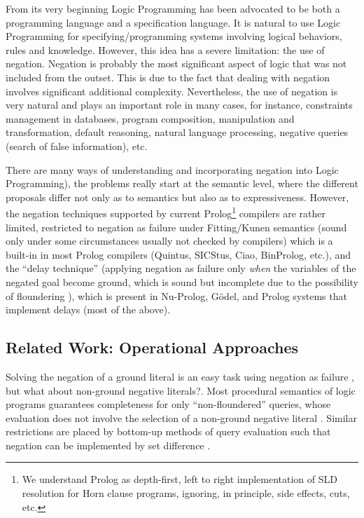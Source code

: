 \documentclass{tlp}
\newcommand{\naf}{{\em naf}}\newcommand{\viejo}[1]{}
\begin{document}
From its very beginning Logic Programming has been advocated to be
both a programming language and a specification language. It is
natural to use Logic Programming for specifying/programming systems
involving logical behaviors, rules and knowledge. However, this idea
has a severe limitation: the use of negation. Negation is probably the
most significant aspect of logic that was not included from the
outset. This is due to the fact that dealing with negation involves
significant additional complexity. Nevertheless, the use of negation
is very natural and plays an important role in many cases, for
instance, constraints management in databases, program composition,
manipulation and transformation, default reasoning, natural language
processing, negative queries (search of false information), etc.



There are many ways of understanding and
incorporating negation into Logic Programming), the problems really
start at the semantic level, where the different proposals %
differ not only as to semantics but also as to expressiveness.
However, the negation techniques supported by current
Prolog\footnote{We understand Prolog as depth-first, left to right
implementation of SLD resolution for Horn clause programs, ignoring,
in principle, side effects, cuts, etc.}  compilers are rather limited,
restricted to negation as failure under Fitting/Kunen semantics
\cite{Kunen} (sound only under some circumstances usually not checked
by compilers) which is a built-in in most Prolog compilers (Quintus,
SICStus, Ciao, BinProlog, etc.), and the ``delay technique'' (applying
negation as failure only \emph{when} the variables of the negated goal
become ground, which is sound but incomplete due to the possibility of
floundering \cite{Borger}), which is present in Nu-Prolog, G\"odel,
and Prolog systems that implement delays (most of the above).

\subsection{Related Work: Operational Approaches}

Solving the negation of a ground literal is an easy task using
negation as failure \cite{Shepherdson84,Shepherdson85}, but what about
non-ground negative literals?. Most procedural semantics of logic
programs guarantees completeness for only ``non-floundered'' queries,
whose evaluation does not involve the selection of a non-ground
negative literal \cite{Bol,Chen,Przymusinski1,Ross}. Similar
restrictions are placed by bottom-up methods of query evaluation such
that negation can be implemented by set difference
\cite{Naughton,Stuckey93}.
\end{document}
